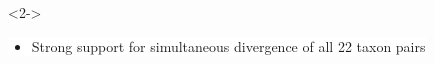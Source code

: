 

{
\begin{frame}
    \begin{columns}

        \vspace{6.5cm}

        \begin{uncoverenv}<2->
        \colorbox{white}{
            \begin{minipage}[t]{0.7\textwidth}
            \begin{adjustwidth}{-2.7em}{}
            \begin{itemize}
                \small
                \item Strong support for simultaneous divergence of all 22 taxon pairs
                

\end{itemize}
\end{adjustwidth}
\end{minipage}}
\end{uncoverenv}
\end{columns}
\end{frame}}
